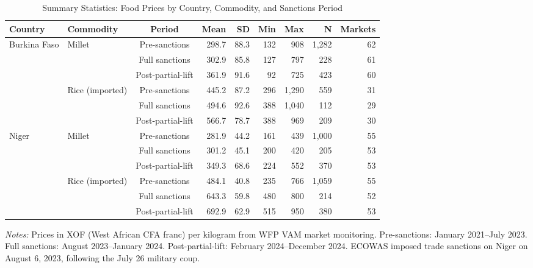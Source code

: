 \begin{table}[htbp]
\centering
\caption{Summary Statistics: Food Prices by Country, Commodity, and Sanctions Period}
\label{tab:summary}
\small
\begin{tabular}{llcrrrrrr}
\toprule
Country & Commodity & Period & Mean & SD & Min & Max & N & Markets \\
\midrule
Burkina Faso & Millet & Pre-sanctions & 298.7 & 88.3 & 132 & 908 & 1,282 & 62 \\
 &  & Full sanctions & 302.9 & 85.8 & 127 & 797 & 228 & 61 \\
 &  & Post-partial-lift & 361.9 & 91.6 & 92 & 725 & 423 & 60 \\
 & Rice (imported) & Pre-sanctions & 445.2 & 87.2 & 296 & 1,290 & 559 & 31 \\
 &  & Full sanctions & 494.6 & 92.6 & 388 & 1,040 & 112 & 29 \\
 &  & Post-partial-lift & 566.7 & 78.7 & 388 & 969 & 209 & 30 \\
\midrule
Niger & Millet & Pre-sanctions & 281.9 & 44.2 & 161 & 439 & 1,000 & 55 \\
 &  & Full sanctions & 301.2 & 45.1 & 200 & 420 & 205 & 53 \\
 &  & Post-partial-lift & 349.3 & 68.6 & 224 & 552 & 370 & 53 \\
 & Rice (imported) & Pre-sanctions & 484.1 & 40.8 & 235 & 766 & 1,059 & 55 \\
 &  & Full sanctions & 643.3 & 59.8 & 480 & 800 & 214 & 52 \\
 &  & Post-partial-lift & 692.9 & 62.9 & 515 & 950 & 380 & 53 \\
\bottomrule
\end{tabular}
\begin{tablenotes}
\item \textit{Notes:} Prices in XOF (West African CFA franc) per kilogram from WFP VAM market monitoring. Pre-sanctions: January 2021--July 2023. Full sanctions: August 2023--January 2024. Post-partial-lift: February 2024--December 2024. ECOWAS imposed trade sanctions on Niger on August 6, 2023, following the July 26 military coup.
\end{tablenotes}
\end{table}
